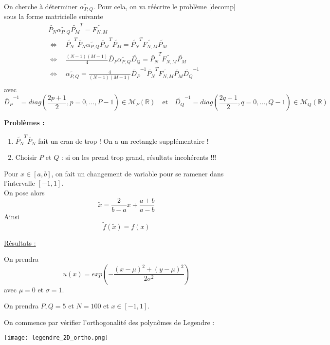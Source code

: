On cherche à déterminer $\widetilde{\alpha_{P,Q}}$. Pour cela, on va réécrire le problème \ref{decomp} sous la forme matricielle suivante
\begin{align*}
	\widetilde{P_N}\widetilde{\alpha_{P,Q}}\widetilde{P_M}^T=\widetilde{F_{N,M}}& \\
	\iff \quad \widetilde{P_N}^T\widetilde{P_N}\widetilde{\alpha_{P,Q}}\widetilde{P_M}^T\widetilde{P_M}=\widetilde{P_N}^T\widetilde{F_{N,M}}\widetilde{P_M}& \\
	\iff \quad \frac{(N-1)(M-1)}{4}\widetilde{D_P}\widetilde{\alpha_{P,Q}}\widetilde{D_Q}=\widetilde{P_N}^T\widetilde{F_{N,M}}\widetilde{P_M}& \\
	\iff \quad \boxed{\widetilde{\alpha_{P,Q}}=\frac{4}{(N-1)(M-1)}\widetilde{D_P}^{-1}\widetilde{P_N}^T\widetilde{F_{N,M}}\widetilde{P_M}\widetilde{D_Q}^{-1}}& \\
\end{align*}
avec
$$\widetilde{D_P}^{-1}=diag\left(\frac{2p+1}{2},p=0,\dots,P-1\right)\in\mathcal{M}_P(\mathbb{R}) \quad \text{et} \quad \widetilde{D_Q}^{-1}=diag\left(\frac{2q+1}{2},q=0,\dots,Q-1\right)\in\mathcal{M}_Q(\mathbb{R})$$

\color{red}
\textbf{Problèmes :}
\begin{enumerate}
	\item $\widetilde{P_N}^T\widetilde{P_N}$ fait un cran de trop ! On a un rectangle supplémentaire !
	\item Choisir $P$ et $Q$ : si on les prend trop grand, résultats incohérents !!!
\end{enumerate}
\color{black}

\begin{Rem}
	Pour $x\in[a,b]$, on fait un changement de variable pour se ramener dans l'intervalle $[-1,1]$. \\
	On pose alors
	$$\tilde{x}=\frac{2}{b-a}x+\frac{a+b}{a-b}$$
	Ainsi
	$$\tilde{f}(\tilde{x})=f(x)$$
\end{Rem}


\underline{Résultats :}

On prendra
$$u(x)=exp\left(-\frac{(x-\mu)^2+(y-\mu)^2}{2\sigma^2}\right)$$
avec $\mu=0$ et $\sigma=1$.

On prendra $P,Q=5$ et $N=100$ et $x\in[-1,1]$.

On commence par vérifier l'orthogonalité des polynômes de Legendre :

\begin{minipage}{\linewidth}
	\centering
	\texttt{[image: legendre\_2D\_ortho.png]}
\end{minipage}

